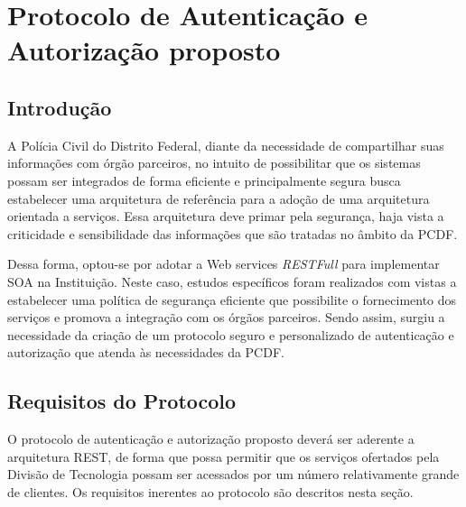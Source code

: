 \chapter{Protocolo de Autenticação e Autorização proposto}\label{cap:Protocolo}
\section{Introdução}

A Polícia Civil do Distrito Federal, diante da necessidade de compartilhar suas informações com órgão parceiros, no intuito de possibilitar que os sistemas possam ser integrados de forma eficiente e principalmente segura busca estabelecer uma arquitetura de referência para a adoção de uma arquitetura orientada a serviços. Essa arquitetura deve primar pela segurança, haja vista a criticidade e sensibilidade das informações que são tratadas no âmbito da PCDF.

Dessa forma, optou-se por adotar a Web services \emph{RESTFull} para implementar SOA na Instituição. Neste caso, estudos específicos foram realizados com vistas a estabelecer uma política de segurança eficiente que possibilite o fornecimento dos serviços e promova a integração com os órgãos parceiros. Sendo assim, surgiu a necessidade da criação de um protocolo seguro e personalizado de autenticação e autorização que atenda às necessidades da PCDF.

\section{Requisitos do Protocolo}\label{sec:reqprotocolo}

O protocolo de autenticação e autorização proposto deverá ser aderente a arquitetura REST, de forma que possa permitir que os serviços ofertados pela Divisão de Tecnologia possam ser acessados por um número relativamente grande de clientes. Os requisitos inerentes ao protocolo são descritos nesta seção.

